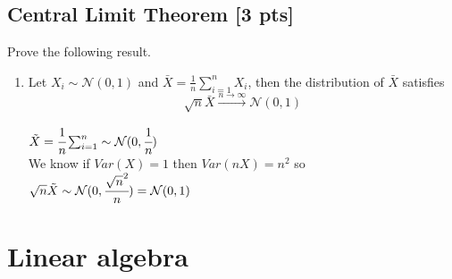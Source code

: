 \documentclass[a4paper]{article}
\theoremstyle{definition}
\newenvironment{soln}{
	\leavevmode\color{blue}\ignorespaces
}{}
\begin{document}
	\subsection{Central Limit Theorem [3 pts]}
	Prove the following result.
	\begin{enumerate}
		\item Let $X_i\sim\mathcal{N}(0, 1)$ and $\bar{X} = \frac{1}{n}\sum_{i=1}^n X_i$, then the distribution of $\bar{X}$ satisfies 
		$$\sqrt{n}\bar{X}\overset{n\rightarrow\infty}{\longrightarrow}\mathcal{N}(0, 1)$$
		
		\begin{soln}
		    $\Tilde{X}=\cfrac{1}{n}\sum_{i=1}^{n}\sim\mathcal{N}(0,\cfrac{1}{n})$ \\
		    We know if $Var(X)=1$ then $Var(nX)=n^{2}$ so \\
		    $\sqrt{n}\Tilde{X}\sim\mathcal{N}(0,\cfrac{\sqrt{n}^{2}}{n})=\mathcal{N}(0,1)$
		\end{soln}
		
	\end{enumerate}
	
	
	
	\section{Linear algebra}
	
	
\end{document}
